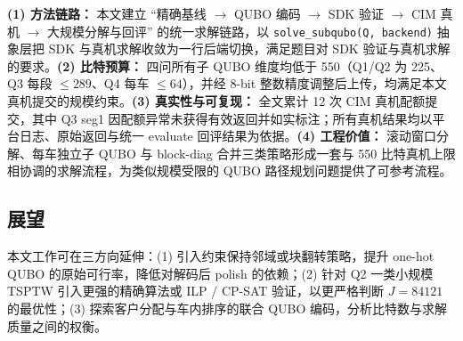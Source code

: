 \documentclass[UTF8,12pt,a4paper]{ctexart}
\begin{document}
\textbf{(1) 方法链路：} 本文建立 ``精确基线 $\to$ QUBO 编码 $\to$ SDK 验证 $\to$ CIM 真机 $\to$ 大规模分解与回评'' 的统一求解链路，以 \texttt{solve\_subqubo(Q, backend)} 抽象层把 SDK 与真机求解收敛为一行后端切换，满足题目对 SDK 验证与真机求解的要求。\textbf{(2) 比特预算：} 四问所有子 QUBO 维度均低于 550（Q1/Q2 为 225、Q3 每段 $\le 289$、Q4 每车 $\le 64$），并经 8-bit 整数精度调整后上传，均满足本文真机提交的规模约束。\textbf{(3) 真实性与可复现：} 全文累计 12 次 CIM 真机配额提交，其中 Q3 seg1 因配额异常未获得有效返回并如实标注；所有真机结果均以平台日志、原始返回与统一 evaluate 回评结果为依据。\textbf{(4) 工程价值：} 滚动窗口分解、每车独立子 QUBO 与 block-diag 合并三类策略形成一套与 550 比特真机上限相协调的求解流程，为类似规模受限的 QUBO 路径规划问题提供了可参考流程。

\subsection{展望}

本文工作可在三方向延伸：(1) 引入约束保持邻域或块翻转策略，提升 one-hot QUBO 的原始可行率，降低对解码后 polish 的依赖；(2) 针对 Q2 一类小规模 TSPTW 引入更强的精确算法或 ILP / CP-SAT 验证，以更严格判断 $J\!=\!84121$ 的最优性；(3) 探索客户分配与车内排序的联合 QUBO 编码，分析比特数与求解质量之间的权衡。
\end{document}
